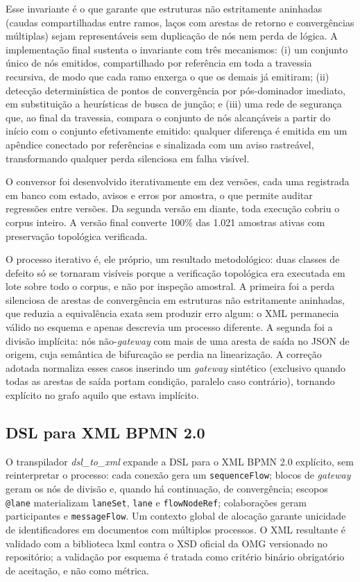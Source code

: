 Esse invariante é o que garante que estruturas não estritamente aninhadas (caudas compartilhadas entre ramos, laços com arestas de retorno e convergências múltiplas) sejam representáveis sem duplicação de nós nem perda de lógica. A implementação final sustenta o invariante com três mecanismos: (i) um conjunto único de nós emitidos, compartilhado por referência em toda a travessia recursiva, de modo que cada ramo enxerga o que os demais já emitiram; (ii) detecção determinística de pontos de convergência por pós-dominador imediato, em substituição a heurísticas de busca de junção; e (iii) uma rede de segurança que, ao final da travessia, compara o conjunto de nós alcançáveis a partir do início com o conjunto efetivamente emitido: qualquer diferença é emitida em um apêndice conectado por referências e sinalizada com um aviso rastreável, transformando qualquer perda silenciosa em falha visível.

O conversor foi desenvolvido iterativamente em dez versões, cada uma registrada em banco com estado, avisos e erros por amostra, o que permite auditar regressões entre versões. Da segunda versão em diante, toda execução cobriu o corpus inteiro. A versão final converte 100\% das 1.021 amostras ativas com preservação topológica verificada.

O processo iterativo é, ele próprio, um resultado metodológico: duas classes de defeito só se tornaram visíveis porque a verificação topológica era executada em lote sobre todo o corpus, e não por inspeção amostral. A primeira foi a perda silenciosa de arestas de convergência em estruturas não estritamente aninhadas, que reduzia a equivalência exata sem produzir erro algum: o XML permanecia válido no esquema e apenas descrevia um processo diferente. A segunda foi a divisão implícita: nós não-\textit{gateway} com mais de uma aresta de saída no JSON de origem, cuja semântica de bifurcação se perdia na linearização. A correção adotada normaliza esses casos inserindo um \textit{gateway} sintético (exclusivo quando todas as arestas de saída portam condição, paralelo caso contrário), tornando explícito no grafo aquilo que estava implícito.

\subsection{DSL para XML BPMN 2.0}
\label{subsec:dsl-to-xml}

O transpilador \textit{dsl\_to\_xml} expande a DSL para o XML BPMN 2.0 explícito, sem reinterpretar o processo: cada conexão gera um \texttt{sequenceFlow}; blocos de \textit{gateway} geram os nós de divisão e, quando há continuação, de convergência; escopos \texttt{@lane} materializam \texttt{laneSet}, \texttt{lane} e \texttt{flowNodeRef}; colaborações geram participantes e \texttt{messageFlow}. Um contexto global de alocação garante unicidade de identificadores em documentos com múltiplos processos. O XML resultante é validado com a biblioteca lxml contra o XSD oficial da OMG versionado no repositório; a validação por esquema é tratada como critério binário obrigatório de aceitação, e não como métrica.

